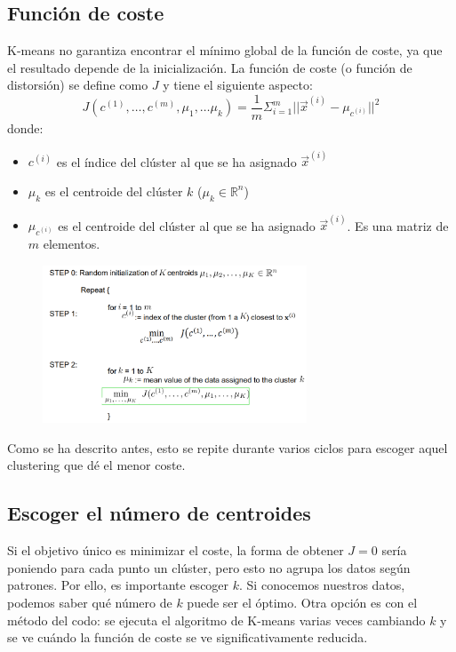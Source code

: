 \subsection{Función de coste}
K-means no garantiza encontrar el mínimo global de la función de coste, ya que el resultado depende de la inicialización. La función de coste (o función de distorsión) se define como $J$ y tiene el siguiente aspecto:
$$J(c^{(1)}, \ldots, c^{(m)}, \mu_1, \ldots \mu_k) = \frac{1}{m} \Sigma^m_{i = 1} ||\vec{x}^{(i)} - \mu_{c^{(i)}} ||^2$$
donde:
\begin{itemize}
\item $c^{(i)}$ es el índice del clúster al que se ha asignado $\vec{x}^{(i)}$
\item $\mu_k$ es el centroide del clúster $k$ ($\mu_k \in \mathbb{R}^n$)
\item $\mu_{c^{(i)}}$ es el centroide del clúster al que se ha asignado $\vec{x}^{(i)}$. Es una matriz de $m$ elementos.
\end{itemize}

\begin{figure}[h]
\centering
\includegraphics[width = 0.7\textwidth]{figs/kmeans-cost.png}
\end{figure}

Como se ha descrito antes, esto se repite durante varios ciclos para escoger aquel clustering que dé el menor coste.

\subsection{Escoger el número de centroides}
Si el objetivo único es minimizar el coste, la forma de obtener $J = 0$ sería poniendo para cada punto un clúster, pero esto no agrupa los datos según patrones. Por ello, es importante escoger $k$. Si conocemos nuestros datos, podemos saber qué número de $k$ puede ser el óptimo. Otra opción es con el método del codo: se ejecuta el algoritmo de K-means varias veces cambiando $k$ y se ve cuándo la función de coste se ve significativamente reducida. 

